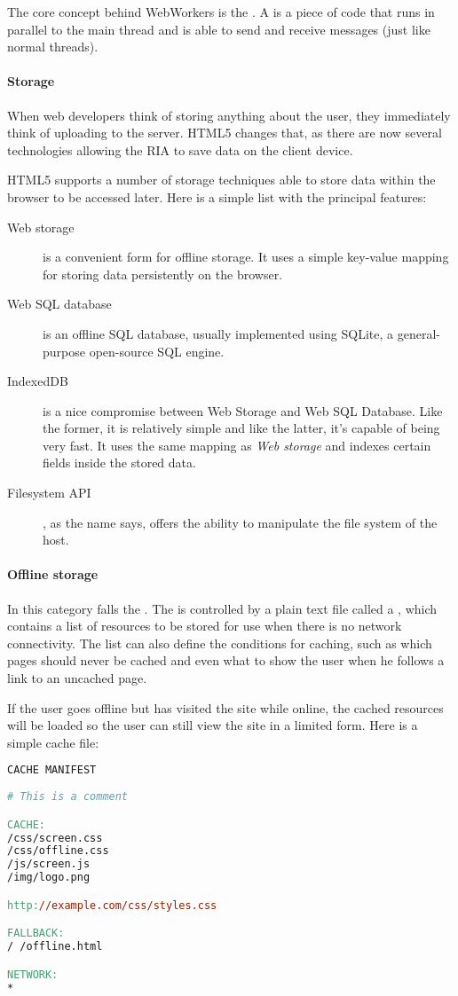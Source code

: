 The core concept behind WebWorkers is the . A  is a
piece of \js{} code that runs in parallel to the main thread and is able to send
and receive messages (just like normal threads).



\paragraph{Storage}
When web developers think of storing anything about the user, they immediately
think of uploading to the server. \ac{HTML}5 changes that, as there are now
several technologies allowing the \ac{RIA} to save data on the client device.

\ac{HTML}5 supports a number of storage techniques able to store data within the
browser to be accessed later. Here is a simple list with the principal features:
\begin{description}
	\item[Web storage] is a convenient form for offline storage. It uses a simple
	key-value mapping for storing data persistently on the browser.

	\item[Web SQL database] is an offline SQL database, usually implemented using
	SQLite, a general-purpose open-source SQL engine.

	\item[IndexedDB] is a nice compromise between Web Storage and Web SQL Database.
	Like the former, it is relatively simple and like the latter, it's capable
	of being very fast. It uses the same mapping as \emph{Web storage} and indexes
	certain fields inside the stored data.

	\item[Filesystem API], as the name says, offers the ability to manipulate the
	file system of the host.
\end{description}


\paragraph{Offline storage}
In this category falls the . The  is
controlled by a plain text file called a , which contains a list
of resources to be stored for use when there is no network connectivity. The list
can also define the conditions for caching, such as which pages should never be
cached and even what to show the user when he follows a link to an uncached page.

If the user goes offline but has visited the site while online, the cached
resources will be loaded so the user can still view the site in a limited form.
Here is a simple cache file:
\begin{lstlisting}[language=make]
CACHE MANIFEST
      
# This is a comment

CACHE:
/css/screen.css
/css/offline.css
/js/screen.js
/img/logo.png

http://example.com/css/styles.css

FALLBACK:
/ /offline.html

NETWORK:
*
\end{lstlisting}